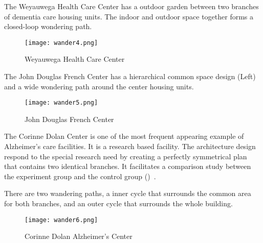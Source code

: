 The Weyauwega Health Care Center has a outdoor garden between two
branches of dementia care housing units. The indoor and outdoor space
together forms a closed-loop wondering path.
\begin{figure}[htbp]
  \centering
  \texttt{[image: wander4.png]}
  \caption[Wandering Path, Weyauwega Health Care Center]{Weyauwega Health Care Center~\cite{dementiaCase}}
  \label{fig:wander4}
\end{figure}

The John Douglas French Center has a hierarchical common space design
(Left) and a wide wondering path around the center housing units.
\begin{figure}[htbp]
  \centering
  \texttt{[image: wander5.png]}
  \caption[John Douglas French Center for Alzheimer’s Disease]{John Douglas French Center~\cite{dementiaCase}}
  \label{fig:wander5}
\end{figure}

The Corinne Dolan Center is one of the most frequent appearing example
of Alzheimer's care facilities. It is a research based facility. The
architecture design respond to the special research need by creating a
perfectly symmetrical plan that contains two identical branches. It
facilitates a comparison study between the experiment group and the
control group ()~\cite{Lewin1990}.

There are two wandering paths, a inner cycle that surrounds the common
area for both branches, and an outer cycle that surrounds the whole
building.
\begin{figure}[htbp]
  \centering
  \texttt{[image: wander6.png]}
  \caption[Corinne Dolan Alzheimer’s Center at Heather Hill]{Corinne Dolan Alzheimer’s Center~\cite{dementiaCase}}
  \label{fig:wander6}
\end{figure}

